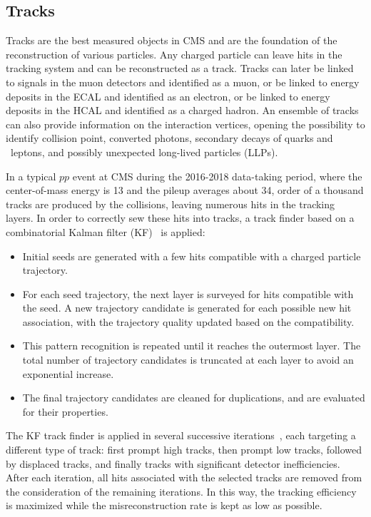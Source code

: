 \subsection{Tracks}\label{sec:reco_track}

Tracks are the best measured objects in CMS and are the foundation of the reconstruction of various particles.
Any charged particle can leave hits in the tracking system and can be reconstructed as a track.
Tracks can later be linked to signals in the muon detectors and identified as a muon, 
or be linked to energy deposits in the ECAL and identified as an electron,
or be linked to energy deposits in the HCAL and identified as a charged hadron.
An ensemble of tracks can also provide information on the interaction vertices, 
opening the possibility to identify collision point, converted photons, 
secondary decays of \Pqb quarks and \tau ~leptons, and possibly unexpected long-lived particles (LLPs).

In a typical $pp$ event at CMS during the 2016-2018 data-taking period, 
where the center-of-mass energy is 13 \TeV and the pileup averages about 34,
order of a thousand tracks are produced by the collisions, leaving numerous hits in the tracking layers.
In order to correctly sew these hits into tracks, a track finder based on a combinatorial Kalman filter (KF)~\cite{Adam:934067} is applied:
\begin{itemize}
  \item Initial seeds are generated with a few hits compatible with a charged particle trajectory.
  \item For each seed trajectory, the next layer is surveyed for hits compatible with the seed.
        A new trajectory candidate is generated for each possible new hit association, 
        with the trajectory quality updated based on the compatibility.
  \item This pattern recognition is repeated until it reaches the outermost layer.
        The total number of trajectory candidates is truncated at each layer to avoid an exponential increase. 
  \item The final trajectory candidates are cleaned for duplications, 
        and are evaluated for their properties.
\end{itemize}

The KF track finder is applied in several successive iterations~\cite{Collaboration_2014}, 
each targeting a different type of track: first prompt high \pt tracks, then prompt low \pt tracks,
followed by displaced tracks, and finally tracks with significant detector inefficiencies.
After each iteration, all hits associated with the selected tracks are removed from the consideration of the remaining iterations.
In this way, the tracking efficiency is maximized while the misreconstruction rate is kept as low as possible.


